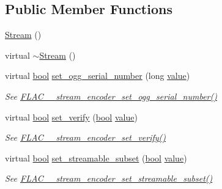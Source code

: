\subsection*{Public Member Functions}
\begin{DoxyCompactItemize}
\item 
\hyperlink{class_f_l_a_c_1_1_encoder_1_1_stream_a4e904a3a816d9fe81826f6eb1966cc26}{Stream} ()
\item 
virtual \hyperlink{class_f_l_a_c_1_1_encoder_1_1_stream_a2e183b54e54c64d20a1f056c88093a50}{$\sim$\+Stream} ()
\item 
virtual \hyperlink{mac_2config_2i386_2lib-src_2libsoxr_2soxr-config_8h_abb452686968e48b67397da5f97445f5b}{bool} \hyperlink{class_f_l_a_c_1_1_encoder_1_1_stream_a72b4d936a2b70e37d903ec924b4dfce8}{set\+\_\+ogg\+\_\+serial\+\_\+number} (long \hyperlink{lib_2expat_8h_a4a30a13b813682e68c5b689b45c65971}{value})
\begin{DoxyCompactList}\small\item\em See \hyperlink{group__flac__stream__encoder_ga646c9800d42620a6c504fbdfbd092666}{F\+L\+A\+C\+\_\+\+\_\+stream\+\_\+encoder\+\_\+set\+\_\+ogg\+\_\+serial\+\_\+number()} \end{DoxyCompactList}\item 
virtual \hyperlink{mac_2config_2i386_2lib-src_2libsoxr_2soxr-config_8h_abb452686968e48b67397da5f97445f5b}{bool} \hyperlink{class_f_l_a_c_1_1_encoder_1_1_stream_a67d44e83d8c94a04d602ec7daf90966a}{set\+\_\+verify} (\hyperlink{mac_2config_2i386_2lib-src_2libsoxr_2soxr-config_8h_abb452686968e48b67397da5f97445f5b}{bool} \hyperlink{lib_2expat_8h_a4a30a13b813682e68c5b689b45c65971}{value})
\begin{DoxyCompactList}\small\item\em See \hyperlink{group__flac__stream__encoder_ga5f4ac18a7207d2864fed72d284486f9e}{F\+L\+A\+C\+\_\+\+\_\+stream\+\_\+encoder\+\_\+set\+\_\+verify()} \end{DoxyCompactList}\item 
virtual \hyperlink{mac_2config_2i386_2lib-src_2libsoxr_2soxr-config_8h_abb452686968e48b67397da5f97445f5b}{bool} \hyperlink{class_f_l_a_c_1_1_encoder_1_1_stream_afd9fe101c9750815c68e69c3e251284c}{set\+\_\+streamable\+\_\+subset} (\hyperlink{mac_2config_2i386_2lib-src_2libsoxr_2soxr-config_8h_abb452686968e48b67397da5f97445f5b}{bool} \hyperlink{lib_2expat_8h_a4a30a13b813682e68c5b689b45c65971}{value})
\begin{DoxyCompactList}\small\item\em See \hyperlink{group__flac__stream__encoder_ga163f1acfe8b6b8ae849f0f4f7c0708f4}{F\+L\+A\+C\+\_\+\+\_\+stream\+\_\+encoder\+\_\+set\+\_\+streamable\+\_\+subset()} \end{DoxyCompactList}\item 

\end{DoxyCompactItemize}
